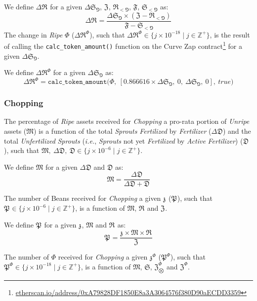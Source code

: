\documentclass[tikz]{article}
\newcommand{\code}[1]{\texttt{#1}}
\newcommand{\term}[1]{\textsl{#1}}
\newcommand{\fref}[1]{\footnote{\href{http://#1}{#1}}}
\newcommand{\bean}{} %
\begin{document}
We define $\Delta \mathfrak{R}^{\bean}$ for a given $\Delta \mathfrak{S}_{\Game}$, $\mathfrak{Z}^{\bean}$, $\mathfrak{R}_{<\Game}^{\bean}$, $\mathfrak{F}$, $\mathfrak{S}_{<\Game}$ as:
$$\Delta \mathfrak{R}^{\bean} = \frac{\Delta \mathfrak{S}_{\Game} \times (\mathfrak{Z}^{\bean} - \mathfrak{R}_{<\Game}^{\bean})}{\mathfrak{F} - \mathfrak{S}_{<\Game}}$$
The change in \term{Ripe} $\Phi$ ($\Delta \mathfrak{R}^{\Phi}$), such that $\Delta \mathfrak{R}^{\Phi} \in \{j \times 10^{-18} \mid j \in \mathbb{Z}^{+} \}$, is the result of calling the \code{calc\_token\_amount()} function on the Curve Zap contract\fref{etherscan.io/address/0xA79828DF1850E8a3A3064576f380D90aECDD3359} for a given $\Delta \mathfrak{S}_{\Game}$.

We define $\Delta \mathfrak{R}^{\Phi}$ for a given $\Delta \mathfrak{S}_{\Game}$ as:
$$\Delta \mathfrak{R}^{\Phi} = \code{calc\_token\_amount(}\Phi,\ [0.866616 \times \Delta \mathfrak{S}_{\Game},\ 0,\ \Delta \mathfrak{S}_{\Game},\ 0],\ true\code{)}$$

\subsubsection{Chopping}
The percentage of \term{Ripe} assets received for \term{Chopping} a pro-rata portion of \term{Unripe} assets ($\mathfrak{M}$) is a function of the total \term{Sprouts} \term{Fertilized} by \term{Fertilizer} ($\Delta \mathfrak{D}$) and the total \term{Unfertilized} \term{Sprouts} (\term{i.e.}, \term{Sprouts} not yet \term{Fertilized} by \term{Active} \term{Fertilizer}) ($\mathfrak{D}$), such that $\mathfrak{M},\ \Delta \mathfrak{D},\ \mathfrak{D} \in \{j \times 10^{-6} \mid j \in \mathbb{Z}^{+} \}$.

We define $\mathfrak{M}$ for a given $\Delta \mathfrak{D}$ and $\mathfrak{D}$ as: 
$$\mathfrak{M} = \frac{\Delta \mathfrak{D}}{\Delta \mathfrak{D} + \mathfrak{D}} $$

The number of Beans received for \term{Chopping} a given $\mathfrak{z}^{\bean}$ ($\mathfrak{P}^{\bean}$), such that $\mathfrak{P}^{\bean} \in \{j \times 10^{-6} \mid j \in \mathbb{Z}^{+} \}$, is a function of $\mathfrak{M}$, $\mathfrak{R}^{\bean}$ and $\mathfrak{Z}^{\bean}$.

We define $\mathfrak{P}^{\bean}$ for a given $\mathfrak{z}^{\bean}$, $\mathfrak{M}$ and $\mathfrak{R}^{\bean}$ as:
$$\mathfrak{P}^{\bean} = \frac{\mathfrak{z}^{\bean} \times \mathfrak{M} \times \mathfrak{R}^{\bean}}{\mathfrak{Z}^{\bean}}$$

The number of $\Phi$ received for \term{Chopping} a given $\mathfrak{z}^{\Phi}$ ($\mathfrak{P}^{\Phi}$), such that $\mathfrak{P}^{\Phi} \in \{j \times 10^{-18} \mid j \in \mathbb{Z}^{+} \}$, is a function of $\mathfrak{M}$, $\mathfrak{S}$, $\mathfrak{Z}_{\bigotimes}^{\Phi}$ and $\mathfrak{Z}^{\Phi}$.
\end{document}
